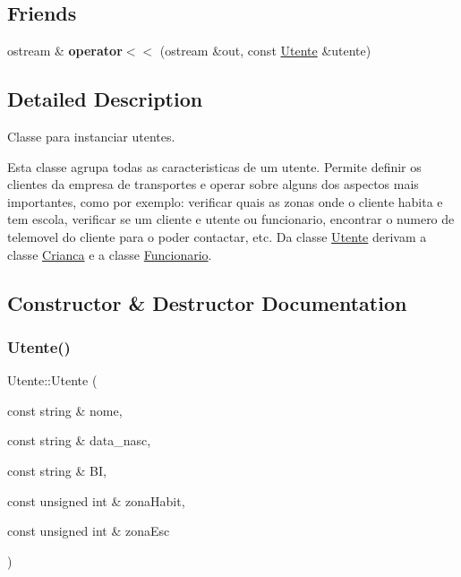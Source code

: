 \subsection*{Friends}
\begin{DoxyCompactItemize}
\item 
\mbox{\label{class_utente_ad9960100ba421bb4e54879250b47dcdf}} 
ostream \& {\bfseries operator$<$$<$} (ostream \&out, const \mbox{\hyperlink{class_utente}{Utente}} \&utente)
\end{DoxyCompactItemize}


\subsection{Detailed Description}
Classe para instanciar utentes. 

Esta classe agrupa todas as caracteristicas de um utente. Permite definir os clientes da empresa de transportes e operar sobre alguns dos aspectos mais importantes, como por exemplo\+: verificar quais as zonas onde o cliente habita e tem escola, verificar se um cliente e utente ou funcionario, encontrar o numero de telemovel do cliente para o poder contactar, etc. Da classe \mbox{\hyperlink{class_utente}{Utente}} derivam a classe \mbox{\hyperlink{class_crianca}{Crianca}} e a classe \mbox{\hyperlink{class_funcionario}{Funcionario}}. 

\subsection{Constructor \& Destructor Documentation}
\mbox{\label{class_utente_adf216e1f6792b96c6404aae73121d44d}} 
\subsubsection{\texorpdfstring{Utente()}{Utente()}}
{\footnotesize\ttfamily Utente\+::\+Utente (\begin{DoxyParamCaption}\item[{const string \&}]{nome,  }\item[{const string \&}]{data\+\_\+nasc,  }\item[{const string \&}]{BI,  }\item[{const unsigned int \&}]{zona\+Habit,  }\item[{const unsigned int \&}]{zona\+Esc }\end{DoxyParamCaption})}




